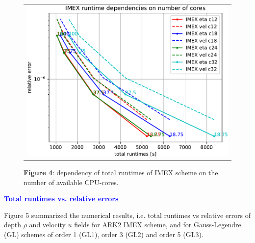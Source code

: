 \documentclass[a4paper,10pt]{article}
\begin{document}
\begin{figure}[t]\centering
\begin{tabular}{c}
 \hspace{-0.4em}\includegraphics[scale=0.66]{Images/Figure_1_new1-crop.pdf}
  \end{tabular}
\caption*{{\bfseries Figure 4}: dependency of total runtimes
    of IMEX scheme on the number of available CPU-cores.
  }
  \end{figure}
  \vspace{2cm}


\noindent \textcolor{blue}{\textbf{Total runtimes vs. relative errors}}

  Figure 5 summarized the numerical results, i.e. total runtimes vs
  relative errors of depth $\rho$ and velocity $ u$ fields for ARK2 IMEX
  scheme, and for Gauss-Legendre (GL) schemes of order 1 (GL1), order 3 (GL2) and order 5 (GL3).
\end{document}

